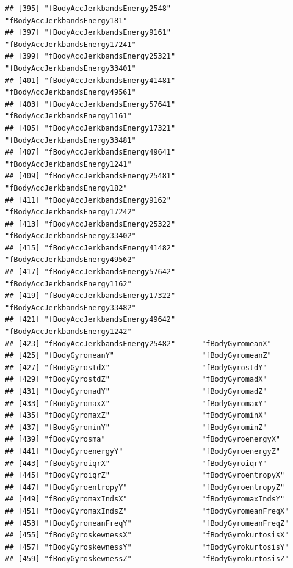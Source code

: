 \documentclass[
]{article}
\begin{document}
\begin{verbatim}
## [395] "fBodyAccJerkbandsEnergy2548"       "fBodyAccJerkbandsEnergy181"       
## [397] "fBodyAccJerkbandsEnergy9161"       "fBodyAccJerkbandsEnergy17241"     
## [399] "fBodyAccJerkbandsEnergy25321"      "fBodyAccJerkbandsEnergy33401"     
## [401] "fBodyAccJerkbandsEnergy41481"      "fBodyAccJerkbandsEnergy49561"     
## [403] "fBodyAccJerkbandsEnergy57641"      "fBodyAccJerkbandsEnergy1161"      
## [405] "fBodyAccJerkbandsEnergy17321"      "fBodyAccJerkbandsEnergy33481"     
## [407] "fBodyAccJerkbandsEnergy49641"      "fBodyAccJerkbandsEnergy1241"      
## [409] "fBodyAccJerkbandsEnergy25481"      "fBodyAccJerkbandsEnergy182"       
## [411] "fBodyAccJerkbandsEnergy9162"       "fBodyAccJerkbandsEnergy17242"     
## [413] "fBodyAccJerkbandsEnergy25322"      "fBodyAccJerkbandsEnergy33402"     
## [415] "fBodyAccJerkbandsEnergy41482"      "fBodyAccJerkbandsEnergy49562"     
## [417] "fBodyAccJerkbandsEnergy57642"      "fBodyAccJerkbandsEnergy1162"      
## [419] "fBodyAccJerkbandsEnergy17322"      "fBodyAccJerkbandsEnergy33482"     
## [421] "fBodyAccJerkbandsEnergy49642"      "fBodyAccJerkbandsEnergy1242"      
## [423] "fBodyAccJerkbandsEnergy25482"      "fBodyGyromeanX"                   
## [425] "fBodyGyromeanY"                    "fBodyGyromeanZ"                   
## [427] "fBodyGyrostdX"                     "fBodyGyrostdY"                    
## [429] "fBodyGyrostdZ"                     "fBodyGyromadX"                    
## [431] "fBodyGyromadY"                     "fBodyGyromadZ"                    
## [433] "fBodyGyromaxX"                     "fBodyGyromaxY"                    
## [435] "fBodyGyromaxZ"                     "fBodyGyrominX"                    
## [437] "fBodyGyrominY"                     "fBodyGyrominZ"                    
## [439] "fBodyGyrosma"                      "fBodyGyroenergyX"                 
## [441] "fBodyGyroenergyY"                  "fBodyGyroenergyZ"                 
## [443] "fBodyGyroiqrX"                     "fBodyGyroiqrY"                    
## [445] "fBodyGyroiqrZ"                     "fBodyGyroentropyX"                
## [447] "fBodyGyroentropyY"                 "fBodyGyroentropyZ"                
## [449] "fBodyGyromaxIndsX"                 "fBodyGyromaxIndsY"                
## [451] "fBodyGyromaxIndsZ"                 "fBodyGyromeanFreqX"               
## [453] "fBodyGyromeanFreqY"                "fBodyGyromeanFreqZ"               
## [455] "fBodyGyroskewnessX"                "fBodyGyrokurtosisX"               
## [457] "fBodyGyroskewnessY"                "fBodyGyrokurtosisY"               
## [459] "fBodyGyroskewnessZ"                "fBodyGyrokurtosisZ"               

\end{verbatim}
\end{document}
